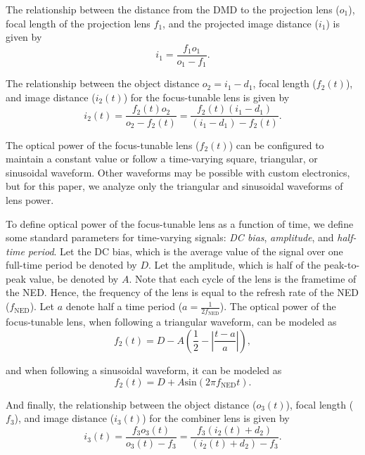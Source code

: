 The relationship between the distance from the DMD to the projection lens ($o_1$), focal length of the projection lens $f_1$, and the projected image distance ($i_1$) is given by
\begin{equation}
i_1 = \frac{f_1 o_1}{o_1 - f_1}.
\label{eq:img1}
\end{equation}

The relationship between the object distance $o_2 = i_1 - d_1$, focal length ($f_2(t)$), and image distance ($i_2(t)$) for the focus-tunable lens is given by
\begin{equation}
i_2(t) = \frac{f_2(t) o_2}{o_2 - f_2(t)} = \frac{f_2(t) (i_1 - d_1)}{(i_1 - d_1) - f_2(t)}.
\label{eq:img2}
\end{equation}

The optical power of the focus-tunable lens ($f_2(t)$) can be configured to maintain a constant value or follow a time-varying square, triangular, or sinusoidal waveform. Other waveforms may be possible with custom electronics, but for this paper, we analyze only the triangular and sinusoidal waveforms of lens power.

To define optical power of the focus-tunable lens as a function of time, we define some standard parameters for time-varying signals: \emph{DC bias}, \emph{amplitude}, and \emph{half-time period}. Let the DC bias, which is the average value of the signal over one full-time period be denoted by $D$. Let the amplitude, which is half of the peak-to-peak value, be denoted by $A$. Note that each cycle of the lens is the frametime of the NED. Hence, the frequency of the lens is equal to the refresh rate of the NED ($f_{\text{NED}}$). Let $a$ denote half a time period ($a = \frac{1}{2f_{\text{NED}}}$). The optical power of the focus-tunable lens, when following a triangular waveform, can be modeled as
\begin{equation}
f_2(t) = D - A\left(\frac{1}{2} - \left|\frac{t - a}{a}\right|\right),
\label{eq:general_triangular}
\end{equation}

and when following a sinusoidal waveform, it can be modeled as
\begin{equation}
f_2(t) = D + A\text{sin}(2\pi f_{\text{NED}} t).
\label{eq:general_sinusoidal}
\end{equation}

And finally, the relationship between the object distance ($o_3(t)$), focal length ($f_3$), and image distance ($i_3(t)$) for the combiner lens is given by
\begin{equation}
i_3(t) = \frac{f_3 o_3(t)}{o_3(t) - f_3} = \frac{f_3(i_2(t) + d_2)}{(i_2(t) + d_2) - f_3}.
\label{eq:img3}
\end{equation}

